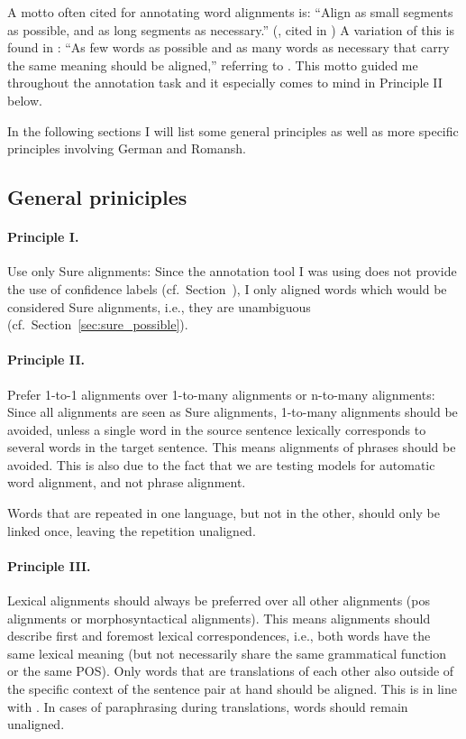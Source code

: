 A motto  often cited for annotating word alignments is:
\enquote{Align as small segments as possible, and as long segments as necessary.} (\cite{Vronis00evaluationof}, cited in \cite{lines2007}) 
A variation of this is found in \textcite{clematide2018}: \enquote{As few words as possible and as many words as necessary that carry the same meaning should be aligned,} referring to \textcite{lambert2005}. This motto  guided me throughout the annotation task and it especially comes to mind in Principle II below.


In the following sections I will list some general principles as well as more specific principles involving German and Romansh.

\subsection{General priniciples}
\label{sec:gold-principles}
\paragraph{Principle I.} 
Use only Sure alignments: 
Since the annotation tool I was using does not provide the use of confidence labels (cf.~Section~), I only aligned words which would be considered Sure alignments, i.e., they are unambiguous (cf.~Section~\ref{sec:sure_possible}). 


\paragraph{Principle II.}
Prefer 1-to-1 alignments over 1-to-many alignments or n-to-many alignments: 
Since all alignments are seen as Sure alignments, 1-to-many alignments should be avoided, unless a single word in the source sentence lexically corresponds to several words in the target sentence. %
This means alignments of phrases should be avoided. This is also due to the fact that we are testing models for automatic word alignment, and not phrase alignment.

Words that are repeated in one language, but not in the other, should only be linked once, leaving the repetition unaligned.

\paragraph{Principle III.}
Lexical alignments should always be preferred over all other alignments (\acrfull{pos} alignments or morphosyntactical alignments). 
This means alignments should describe first and foremost lexical correspondences, i.e., both words have the same lexical meaning (but not necessarily share the same grammatical function or the same POS).
Only words that are translations of each other also outside of the specific context of the sentence pair at hand should be aligned. This is in line with \textcite{clematide2018}.
In cases of paraphrasing during translations, words should remain unaligned. %

